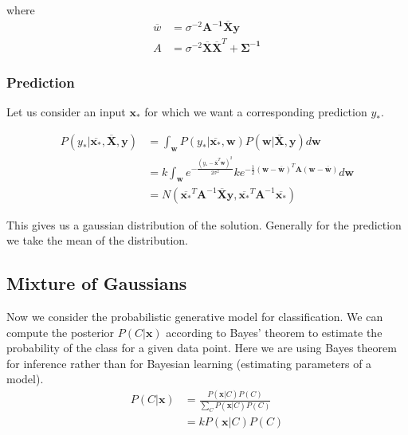 \documentclass[12pt]{article}
\begin{document}
        where
        \begin{align*}
        \overline{w} &= \sigma^{-2}\boldsymbol{A^{-1}}\overline{\boldsymbol{X}}\boldsymbol{y} \\
        A &= \sigma^{-2}\boldsymbol{\overline{X}\overline{X}}^T + \boldsymbol{\Sigma^{-1}}
        \end{align*}

        \subsubsection{Prediction}
            Let us consider an input $\boldsymbol{x_*}$ for which we want a corresponding prediction $y_*$.

            \begin{align*}
                P(y_*|\overline{\boldsymbol{x_*}}, \overline{\boldsymbol{X}}, \boldsymbol{y}) &= \int_{\boldsymbol{w}} P(y_*|\overline{\boldsymbol{x_*}},\boldsymbol{w})P(\boldsymbol{w}|\overline{\boldsymbol{X}},\boldsymbol{y})d\boldsymbol{w} \\
                &= k \int_{\boldsymbol{w}} e^{-\frac{(y_* - \overline{\boldsymbol{x}}^T\boldsymbol{w})^2}{2\sigma^2}} ke^{-\frac{1}{2}(\boldsymbol{w}-\overline{\boldsymbol{w}})^T\boldsymbol{A}(\boldsymbol{w}-\overline{\boldsymbol{w}})}d\boldsymbol{w} \\
                &= N(\overline{\boldsymbol{x_*}}^T \boldsymbol{A}^{-1}\overline{\boldsymbol{X}}\boldsymbol{y}, \overline{\boldsymbol{x_*}}^T \boldsymbol{A}^{-1} \overline{\boldsymbol{x_*}})
            \end{align*}

            This gives us a gaussian distribution of the solution. Generally for the prediction we take the mean of the distribution. 
    
    \subsection{Mixture of Gaussians}
        Now we consider the probabilistic generative model for classification. We can compute the posterior $P(C|\boldsymbol{x})$ according to Bayes' theorem to estimate the probability of the class for a given data point. Here we are using
        Bayes theorem for inference rather than for Bayesian learning (estimating parameters of a model).
        \begin{align*}
            P(C|\boldsymbol{x}) &= \frac{P(\boldsymbol{x}|C)P(C)}{\sum_C P(\boldsymbol{x}|C)P(C)} \\
            &= k P(\boldsymbol{x}|C)P(C)
        \end{align*}
\end{document}
